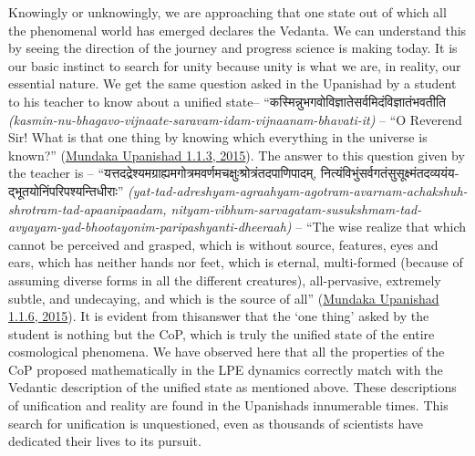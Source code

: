 \documentclass[twoside, 13pt]{article}
\begin{document}
{{{\fontsize{12}{14}\selectfont Knowingly or unknowingly, we are approaching that one state out of which all the phenomenal world has emerged declares the Vedanta. We can understand this by seeing the direction of the journey and progress science is making today. It is our basic instinct to search for unity because unity is what we are, in reality, our essential nature. We get the same question asked in the Upanishad by a student to his teacher to know about a unified state– \foreignlanguage{hindi}{{\fontsize{9}{11}\selectfont “कस्मिन्नुभगवोविज्ञातेसर्वमिदंविज्ञातंभवतीति }}\textit{(kasmin-nu-bhagavo-vijnaate-saravam-idam-vijnaanam-bhavati-it)} – “O Reverend Sir! What is that one thing by knowing which everything in the universe is known?” (\underline{Mundaka Upanishad 1.1.3, 2015}). The answer to this question given by the teacher is – \foreignlanguage{hindi}{{\fontsize{9}{11}\selectfont “यत्तदद्रेश्यमग्राह्यमगोत्रमवर्णमचक्षुःश्रोत्रंतदपाणिपादम्, नित्यंविभुंसर्वगतंसुसूक्ष्मंतदव्ययंयद्भूतयोनिंपरिपश्यन्तिधीराः”}} \textit{(yat-tad-adreshyam-agraahyam-agotram-avarn\break am-achakshuh-shrotram-tad-apaanipaadam, nityam-vibhum-sarvagatam-susukshmam-\break tad-avyayam-yad-bhootayonim-paripashyanti-dheeraah)} – “The wise realize that which cannot be perceived and grasped, which is without source, features, eyes and ears, which has neither hands nor feet, which is eternal, multi-formed (because of assuming diverse forms in all the different creatures), all-pervasive, extremely subtle, and undecaying, and which is the source of all” (\underline{Mundaka Upanishad 1.1.6, 2015}). It is evident from this\break answer that the ‘one thing’ asked by the student is nothing but the CoP, which is truly the unified state of the entire cosmological phenomena. We have observed here that all the properties of the CoP proposed mathematically in the LPE dynamics correctly match with the Vedantic description of the unified state as mentioned above. These descriptions of unification and reality are found in the Upanishads innumerable times. This search for unification is unquestioned, even as thousands of scientists have dedicated their lives to its pursuit.}


{\fontsize{12}{14}\selectfont
\begin{thebibliography}{99}\label{ref-1}


\end{thebibliography}}}}
\end{document}
